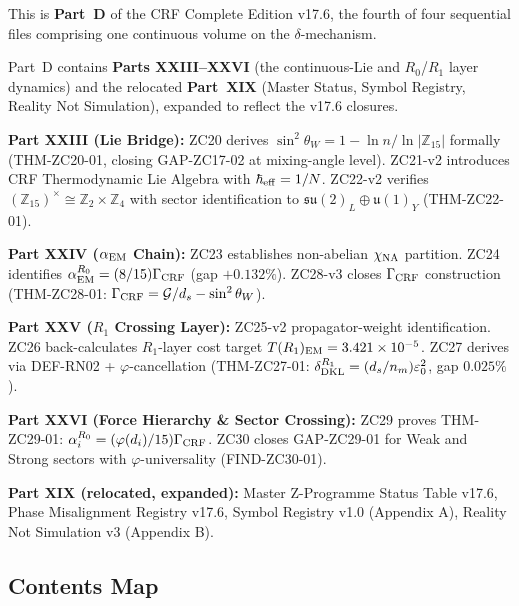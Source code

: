 \documentclass[11pt, a4paper]{article}
\begin{document}
\begin{volumebox}[title={Part D --- CRF Complete Edition v17.6 (Parts XXIII--XXVI + XIX)}]
\sloppy
This is \textbf{Part~D} of the CRF Complete Edition v17.6, the fourth
of four sequential files comprising one continuous volume on the
$\delta$-mechanism.

Part~D contains \textbf{Parts XXIII--XXVI} (the continuous-Lie and
$R_0$/$R_1$ layer dynamics) and the relocated \textbf{Part~XIX}
(Master Status, Symbol Registry, Reality Not Simulation), expanded
to reflect the v17.6 closures.

\textbf{Part XXIII (Lie Bridge):} ZC20 derives
$\sin^2\theta_W = 1 - \ln n/\ln|\mathbb{Z}_{15}|$ formally
(THM-ZC20-01, closing GAP-ZC17-02 at mixing-angle level). ZC21-v2
introduces CRF Thermodynamic Lie Algebra with $\hbar_{\rm eff}=1/N$.
ZC22-v2 verifies $(\mathbb{Z}_{15})^\times \cong \mathbb{Z}_2 \times \mathbb{Z}_4$
with sector identification to $\mathfrak{su}(2)_L \oplus \mathfrak{u}(1)_Y$
(THM-ZC22-01).

\textbf{Part XXIV ($\alpha_{\rm EM}$ Chain):} ZC23 establishes
non-abelian $\chi_{\rm NA}$ partition. ZC24 identifies
$\alpha_{\rm EM}^{R_0} = (8/15)\Gamma_{\rm CRF}$ (gap $+0.132\%$).
ZC28-v3 closes $\Gamma_{\rm CRF}$ construction
(THM-ZC28-01: $\Gamma_{\rm CRF} = \mathcal{G}/d_s - \sin^2\theta_W$).

\textbf{Part XXV ($R_1$ Crossing Layer):} ZC25-v2 propagator-weight
identification. ZC26 back-calculates $R_1$-layer cost target
$T(R_1)_{\rm EM} = 3.421\times 10^{-5}$. ZC27 derives via
DEF-RN02 + $\varphi$-cancellation (THM-ZC27-01:
$\delta_{\rm DKL}^{R_1} = (d_s/n_m)\varepsilon_0^2$, gap $0.025\%$).

\textbf{Part XXVI (Force Hierarchy \& Sector Crossing):} ZC29 proves
THM-ZC29-01: $\alpha_i^{R_0} = (\varphi(d_i)/15)\Gamma_{\rm CRF}$.
ZC30 closes GAP-ZC29-01 for Weak and Strong sectors with
$\varphi$-universality (FIND-ZC30-01).

\textbf{Part XIX (relocated, expanded):} Master Z-Programme Status
Table v17.6, Phase Misalignment Registry v17.6, Symbol Registry v1.0
(Appendix A), Reality Not Simulation v3 (Appendix B).
\end{volumebox}

\subsection*{Contents Map}
\end{document}
